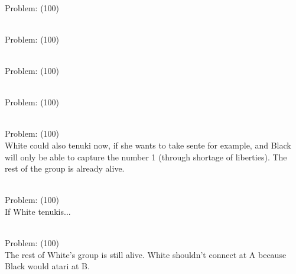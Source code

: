 \documentclass[11pt]{article}
\begin{document}
\begin{minipage}[t]{0.5\textwidth}
  {\centering
  
\\
Problem: (100)\\
  }
\end{minipage}
\begin{minipage}[t]{0.5\textwidth}
  {\centering
  
\\
Problem: (100)\\
  }
\end{minipage}
\begin{minipage}[t]{0.5\textwidth}
  {\centering
  
\\
Problem: (100)\\
  }
\end{minipage}
\begin{minipage}[t]{0.5\textwidth}
  {\centering
  
\\
Problem: (100)\\
  }
\end{minipage}
\begin{minipage}[t]{0.5\textwidth}
  {\centering
  
\\
Problem: (100)\\
White could also tenuki now, if she wants to take sente for example, and Black will only be able to capture the number 1 (through shortage of liberties). The rest of the group is already alive.\\
  }
\end{minipage}
\begin{minipage}[t]{0.5\textwidth}
  {\centering
  
\\
Problem: (100)\\
If White tenukis...\\
  }
\end{minipage}
\begin{minipage}[t]{0.5\textwidth}
  {\centering
  
\\
Problem: (100)\\
The rest of White's group is still alive. White shouldn't connect at A because Black would atari at B.\\
  }
\end{minipage}
\end{document}
